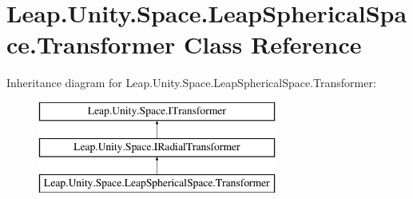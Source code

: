 \hypertarget{class_leap_1_1_unity_1_1_space_1_1_leap_spherical_space_1_1_transformer}{}\section{Leap.\+Unity.\+Space.\+Leap\+Spherical\+Space.\+Transformer Class Reference}
\label{class_leap_1_1_unity_1_1_space_1_1_leap_spherical_space_1_1_transformer}
Inheritance diagram for Leap.\+Unity.\+Space.\+Leap\+Spherical\+Space.\+Transformer\+:\begin{figure}[H]
\begin{center}
\leavevmode
\includegraphics[height=3.000000cm]{class_leap_1_1_unity_1_1_space_1_1_leap_spherical_space_1_1_transformer}
\end{center}
\end{figure}
